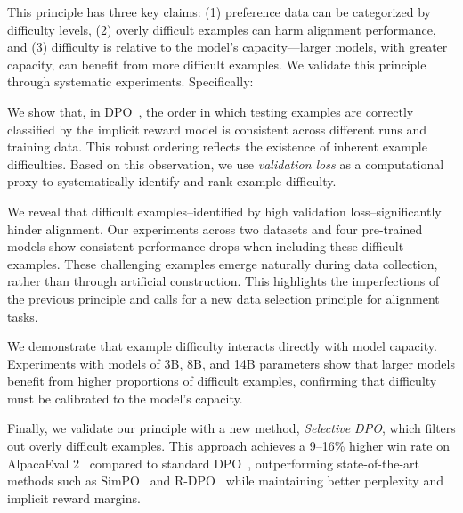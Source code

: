 \noindent{}

This principle has three key claims: (1) preference data can be categorized by difficulty levels, (2) overly difficult examples can harm alignment performance, and (3) difficulty is relative to the model's capacity---larger models, with greater capacity, can benefit from more difficult examples. We validate this principle through systematic experiments. Specifically:

 We show that, in DPO~\cite{rafailov2024direct}, the order in which testing examples are correctly classified by the implicit reward model is consistent across different runs and training data. This robust ordering reflects the existence of inherent example difficulties.
Based on this observation, we use \textit{validation loss} as a computational proxy to systematically identify and rank example difficulty.

We reveal that difficult examples--identified by high validation loss--significantly hinder alignment. 
Our experiments across two datasets and four pre-trained models show consistent performance drops when including these difficult examples. 
These challenging examples emerge naturally during data collection, rather than through artificial construction.
This highlights the imperfections of the previous principle and calls for a new data selection principle for alignment tasks. 




We demonstrate that example difficulty interacts directly with model capacity. Experiments with models of 3B, 8B, and 14B parameters show that larger models benefit from higher proportions of difficult examples, confirming that difficulty must be calibrated to the model’s capacity. 


Finally, we validate our principle with a new method, \textit{Selective DPO}, which filters out overly difficult examples. This approach achieves a 9--16\% higher win rate on AlpacaEval 2~\cite{dubois2024length} compared to standard DPO~\cite{rafailov2024direct}, outperforming state-of-the-art methods such as SimPO~\cite{meng2024simpo} and R-DPO~\cite{Park2024DisentanglingLF} while maintaining better perplexity and implicit reward margins. 
